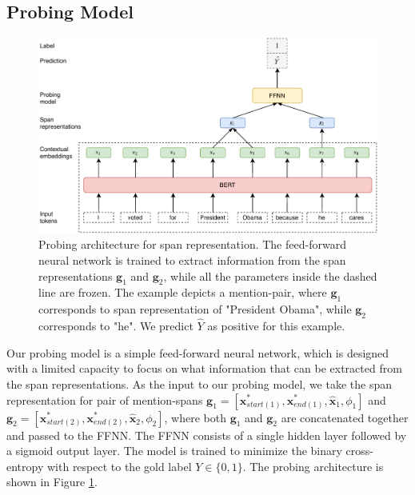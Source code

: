 \documentclass[11pt]{article}
\begin{document}
\subsection{Probing Model}
\begin{figure}[ht]
  \includegraphics[width=\textwidth]{probing_model}
  \caption{Probing architecture for span representation. The feed-forward neural network is trained to extract information from the span representations $\pmb{g}_{1}$ and $\pmb{g}_{2}$, while all the parameters inside the dashed line are frozen. The example depicts a mention-pair, where $\pmb{g}_{1}$ corresponds to span representation of "President Obama", while $\pmb{g}_{2}$ corresponds to "he". We predict $\hat{Y}$ as positive for this example.}
  \label{fig:probing_model}
\end{figure}

Our probing model is a simple feed-forward neural network, which is designed with a limited capacity to focus on what information that can be extracted from the span representations.
As the input to our probing model, we take the span representation for pair of mention-spans $\pmb{g}_{1} = [\pmb{x}_{start(1)}^{*}, \pmb{x}_{end(1)}^{*}, \hat{\pmb{x}}_{1}, \phi_{1}]$ and $\pmb{g}_{2} = [\pmb{x}_{start(2)}^{*}, \pmb{x}_{end(2)}^{*}, \hat{\pmb{x}}_{2}, \phi_{2}]$, where both $\pmb{g}_{1}$ and $\pmb{g}_{2}$ are concatenated together and passed to the FFNN. The FFNN consists of a single hidden layer followed by a sigmoid output layer. The model is trained to minimize the binary cross-entropy with respect to the gold label $Y \in \{0,1\}$. The probing architecture is shown in Figure \ref{fig:probing_model}.
\end{document}
